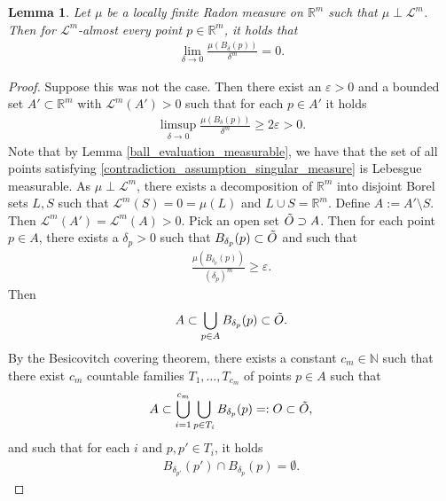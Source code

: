 \documentclass[a4paper,10pt]{article}
\newtheorem{lemma}[theorem]{Lemma}
\numberwithin{equation}{section}
\newcommand{\R}{\mathbb{R}}
\newcommand{\N}{\mathbb{N}}
\newcommand{\e}{\varepsilon}
\begin{document}
\begin{lemma}\label{singular_measure_lebesgue_point}
    Let $\mu$ be a locally finite Radon measure on $\R^m$ such that $\mu \perp \mathcal{L}^m$. 
    Then for $\mathcal{L}^m$-almost every point $p\in \R^m$, it holds that 
   \begin{align}
        \lim_{\delta\to 0} \frac{\mu(B_\delta(p))}{\delta^m } = 0.
    \end{align}
\end{lemma}
\begin{proof}
 Suppose this was not the case. Then there exist an $\e>0$ and a bounded set $A' \subset \R^m$ with $\mathcal{L}^m(A')>0$ such that for each $p \in A'$ it holds 
    \begin{align}\label{contradiction_assumption_singular_measure}
        \limsup_{\delta\to 0} \frac{\mu(B_\delta(p))}{\delta^m } \geq  2\e>0.
    \end{align}
    Note that by Lemma \ref{ball_evaluation_measurable}, we have that the set of all points satisfying \eqref{contradiction_assumption_singular_measure} is Lebesgue measurable. 
    As $\mu \perp \mathcal{L}^m$, there exists a decomposition of $\R^m$ into disjoint Borel sets $L, S$ such that $\mathcal{L}^m(S) = 0 = \mu(L)$ and $L \cup S = \R^m$.
    Define $A:= A' \setminus S$. Then $\mathcal{L}^m(A')= \mathcal{L}^m(A) >0$. Pick an open set $\Tilde{O} \supset A$. Then for each point $p \in A$, there exists a $\delta_p> 0$ such that $B_{\delta_p}(p) \subset \Tilde{O}$ and such that 
    \begin{align}\label{choice_delta_p}
        \frac{\mu(B_{\delta_p}(p))}{(\delta_p)^m} \geq  \e.
    \end{align}
    Then 
    \begin{align*}
        A \subset \bigcup_{p \in A} B_{\delta_p}(p) \subset \Tilde{O}.
    \end{align*} 
    By the Besicovitch covering theorem, there exists a constant $c_m \in \N$ such that there exist $c_m$ countable families $T_1, \ldots, T_{c_m}$ of points $p \in A$ such that 
    \begin{align*}
         A \subset \bigcup_{i=1}^{c_m} \bigcup_{p\in T_i} B_{\delta_{p}}(p) =:O \subset \Tilde{O},  
    \end{align*}
    and such that for each $i$ and $p, p' \in T_i$, it holds 
    \begin{align}\label{pairwise_disjoint_balls}
        B_{\delta_{p'}}(p') \cap B_{\delta_{p}}(p) = \emptyset.

\end{align}
\end{proof}
\end{document}
